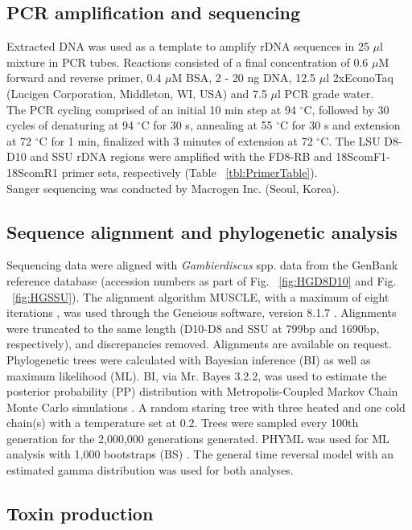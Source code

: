 \documentclass[12pt]{article}
\begin{document}
\subsection{PCR amplification and sequencing}
Extracted DNA was used as a template to amplify rDNA sequences in 25 $\mu$l mixture in PCR tubes. 
Reactions consisted of a final concentration of 0.6 $\mu$M forward and reverse primer, 0.4 $\mu$M BSA, 2 - 20 ng DNA, 12.5 $\mu$l 2xEconoTaq (Lucigen Corporation, Middleton, WI, USA) and 7.5 $\mu$l PCR grade water.\\
The PCR cycling comprised of an initial 10 min step at 94 $^{\circ}$C, followed by 30 cycles of denaturing at 94 $^{\circ}$C for 30 s, annealing at 55 $^{\circ}$C for 30 s and extension at 72 $^{\circ}$C for 1 min, finalized with 3 minutes of extension at 72 $^{\circ}$C.
The LSU D8-D10 and SSU rDNA regions were amplified with the FD8-RB and 18ScomF1-18ScomR1 primer sets, respectively (Table ~\ref{tbl:PrimerTable}).\\
Sanger sequencing was conducted by Macrogen Inc. (Seoul, Korea).


\subsection{Sequence alignment and phylogenetic analysis}
Sequencing data were aligned with \emph{Gambierdiscus} spp. data from the GenBank reference database (accession numbers as part of Fig. ~\ref{fig:HGD8D10} and Fig. ~\ref{fig:HGSSU}). 
The alignment algorithm MUSCLE, with a maximum of eight iterations \citep{edgar2004muscle}, was used through the Geneious software, version 8.1.7 \citep{kearse2012geneious}. 
Alignments were truncated to the same length (D10-D8 and SSU at 799bp and 1690bp, respectively), and discrepancies removed. 
Alignments are available on request.
Phylogenetic trees were calculated with Bayesian inference (BI) as well as maximum likelihood (ML). 
BI, via Mr. Bayes 3.2.2, was used to estimate the posterior probability (PP) distribution with Metropolis-Coupled Markov Chain Monte Carlo simulations \citep{ronquist2003mrbayes}. 
A random staring tree with three heated and one cold chain(s) with a temperature set at 0.2. Trees were sampled every 100th generation for the 2,000,000 generations generated.
PHYML was used for ML analysis with 1,000 bootstraps (BS) \citep{guindon2003simple}.
The general time reversal model with an estimated gamma distribution was used for both analyses.\\

\subsection{Toxin production}
\end{document}
